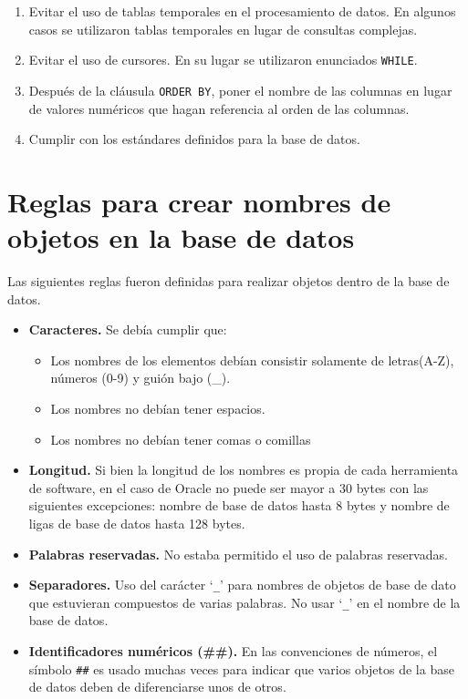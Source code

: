 \begin{enumerate}
\item Evitar el uso de tablas temporales en el procesamiento de datos. En
  algunos casos se utilizaron tablas temporales en lugar de consultas complejas.

\item Evitar el uso de cursores. En su lugar se utilizaron enunciados
  \texttt{WHILE}.

\item Después de la cláusula \texttt{ORDER BY}, poner el nombre de las columnas
  en lugar de valores numéricos que hagan referencia al orden de las columnas.

\item Cumplir con los estándares definidos para la base de datos.

\end{enumerate}

\section{Reglas para crear nombres de objetos en la base de datos}

Las siguientes reglas fueron definidas para realizar objetos dentro de la base
de datos.

\begin{itemize}

\item \textbf{Caracteres.} Se debía cumplir que:

  \begin{itemize}
  \item Los nombres de los elementos debían consistir solamente de letras(A-Z),
    números (0-9) y guión bajo (\_).
  \item Los nombres no debían tener espacios.
  \item Los nombres no debían tener comas o comillas
  \end{itemize}

\item \textbf{Longitud.} Si bien la longitud de los nombres es propia de cada
  herramienta de software, en el caso de Oracle no puede ser mayor a 30 bytes
  con las siguientes excepciones: nombre de base de datos hasta 8 bytes y nombre
  de ligas de base de datos hasta 128 bytes.

\item \textbf{Palabras reservadas.} No estaba permitido el uso de palabras
  reservadas.

\item \textbf{Separadores.} Uso del carácter `\texttt{\_}' para nombres de
  objetos de base de dato que estuvieran compuestos de varias palabras. No usar
  `\texttt{\_}' en el nombre de la base de datos.

\item \textbf{Identificadores numéricos (\#\#).} En las convenciones de números,
  el símbolo \texttt{\#\#} es usado muchas veces para indicar que varios objetos
  de la base de datos deben de diferenciarse unos de otros.

\end{itemize}

